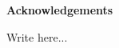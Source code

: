 \noindent
{\LARGE\textbf{Acknowledgements}}
\vspace{1cm}

\begin{spacing}{1.5} 
\noindent
Write here...

\end{spacing}
